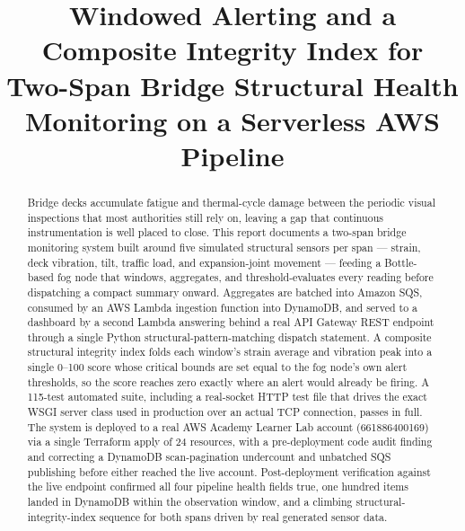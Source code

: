 \documentclass[conference]{IEEEtran}
\begin{document}
\title{Windowed Alerting and a Composite Integrity Index for Two-Span Bridge Structural Health Monitoring on a Serverless AWS Pipeline}

\author{
}

\maketitle

\begin{abstract}
Bridge decks accumulate fatigue and thermal-cycle damage between the periodic visual inspections that most authorities still rely on, leaving a gap that continuous instrumentation is well placed to close. This report documents a two-span bridge monitoring system built around five simulated structural sensors per span --- strain, deck vibration, tilt, traffic load, and expansion-joint movement --- feeding a Bottle-based fog node that windows, aggregates, and threshold-evaluates every reading before dispatching a compact summary onward. Aggregates are batched into Amazon SQS, consumed by an AWS Lambda ingestion function into DynamoDB, and served to a dashboard by a second Lambda answering behind a real API Gateway REST endpoint through a single Python structural-pattern-matching dispatch statement. A composite structural integrity index folds each window's strain average and vibration peak into a single 0--100 score whose critical bounds are set equal to the fog node's own alert thresholds, so the score reaches zero exactly where an alert would already be firing. A 115-test automated suite, including a real-socket HTTP test file that drives the exact WSGI server class used in production over an actual TCP connection, passes in full. The system is deployed to a real AWS Academy Learner Lab account (661886400169) via a single Terraform apply of 24 resources, with a pre-deployment code audit finding and correcting a DynamoDB scan-pagination undercount and unbatched SQS publishing before either reached the live account. Post-deployment verification against the live endpoint confirmed all four pipeline health fields true, one hundred items landed in DynamoDB within the observation window, and a climbing structural-integrity-index sequence for both spans driven by real generated sensor data.
\end{abstract}
\end{document}
